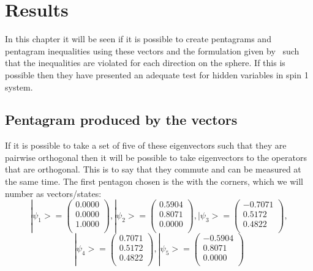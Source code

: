 \chapter{Results}
In this chapter it will be seen if it is possible to create pentagrams and pentagram inequalities using these vectors and the formulation given by~\cite{PhysRevLett.101.020403} such that the inequalities are violated for each direction on the sphere. 
If this is possible then they have presented an adequate test for hidden variables in spin 1 system.

\section{Pentagram produced by the vectors}\label{sec:Pentagram produced by the vectors}
If it is possible to take a set of five of these eigenvectors such that they are pairwise orthogonal then it will be possible to take eigenvectors to the operators that are orthogonal. This is to say that they commute and can be measured at the same time. The first pentagon chosen is the with the corners, which we will number as vectors/states:\\
\begin{equation*}
|\psi_1>=
\begin{pmatrix}
0.0000\\
0.0000\\
1.0000\\
\end{pmatrix}
,
|\psi_2>=
\begin{pmatrix}
0.5904\\
0.8071\\
0.0000\\
\end{pmatrix}
,
|\psi_3>=
\begin{pmatrix}
-0.7071\\
0.5172\\
0.4822\\
\end{pmatrix}
,
\end{equation*}
\begin{equation*}
|\psi_4>=
\begin{pmatrix}
0.7071\\
0.5172\\
0.4822\\
\end{pmatrix}
,
|\psi_5>=
\begin{pmatrix}
-0.5904\\
0.8071\\
0.0000\\
\end{pmatrix}
\end{equation*}
